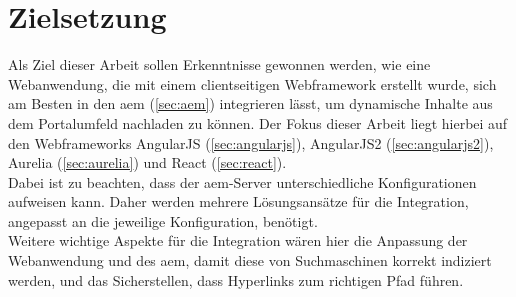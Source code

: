 \section{Zielsetzung}

Als Ziel dieser Arbeit sollen Erkenntnisse gewonnen werden, wie eine Webanwendung, die mit einem clientseitigen Webframework erstellt wurde, sich am Besten in den \ac{aem} (\autoref{sec:aem}) integrieren lässt, um dynamische Inhalte aus dem Portalumfeld nachladen zu können. Der Fokus dieser Arbeit liegt hierbei auf den Webframeworks AngularJS (\autoref{sec:angularjs}),  AngularJS2 (\autoref{sec:angularjs2}), Aurelia (\autoref{sec:aurelia}) und React (\autoref{sec:react}).\\
Dabei ist zu beachten, dass der \ac{aem}-Server unterschiedliche Konfigurationen aufweisen kann. Daher werden mehrere Lösungsansätze für die Integration, angepasst an die jeweilige Konfiguration, benötigt. \\
Weitere wichtige Aspekte für die Integration wären hier die Anpassung der Webanwendung und des \ac{aem}, damit diese von Suchmaschinen korrekt indiziert werden, und das Sicherstellen, dass Hyperlinks zum richtigen Pfad führen. \\




